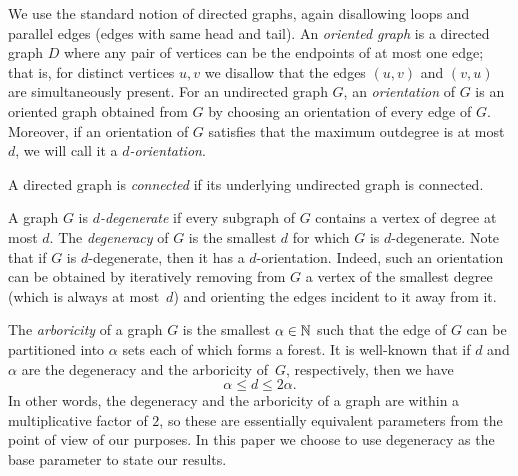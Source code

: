 
We use the standard notion of directed graphs, again disallowing loops and parallel edges (edges with same head and tail). An \emph{oriented graph} is a directed graph $D$ where any pair of vertices can be the endpoints of at most one edge; that is, for distinct vertices $u,v$ we disallow that the edges $(u,v)$ and $(v,u)$ are simultaneously present. For an undirected graph $G$, an \emph{orientation} of $G$ is an oriented graph obtained from $G$ by choosing an orientation of every edge of $G$. Moreover, if an orientation of $G$ satisfies that the maximum outdegree is at most $d$, we will call it a \emph{$d$-orientation}. 

A directed graph is \textit{connected} if its underlying undirected graph is connected.

A graph $G$ is \emph{$d$-degenerate} if every subgraph of $G$ contains a vertex of degree at most $d$. The \emph{degeneracy} of $G$ is the smallest $d$ for which $G$ is $d$-degenerate. Note that if $G$ is $d$-degenerate, then it has a $d$-orientation. Indeed, such an orientation can be obtained by iteratively removing from $G$ a vertex of the smallest degree (which is always at most~$d$) and orienting the edges incident to it away from it.

The \emph{arboricity} of a graph $G$ is the smallest $\alpha\in \mathbb{N}$ such that the edge of $G$ can be partitioned into $\alpha$ sets each of which forms a forest. It is well-known that if $d$ and $\alpha$ are the degeneracy and the arboricity of~$G$, respectively, then we have
\[\alpha\leq d\leq 2\alpha.\]
In other words, the degeneracy and the arboricity of a graph are within a multiplicative factor of $2$, so these are essentially equivalent parameters from the point of view of our purposes. In this paper we choose to use degeneracy as the base parameter to state our results.




